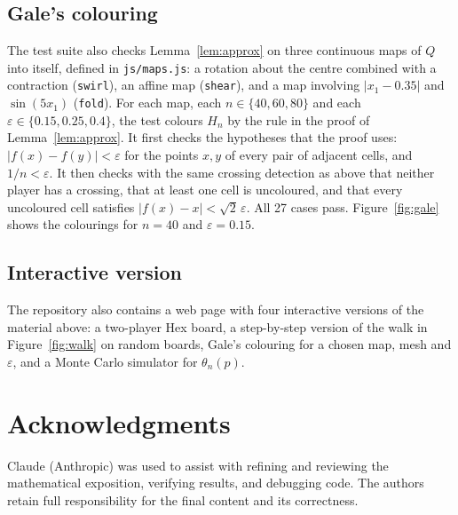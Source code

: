 \documentclass[11pt,a4paper]{amsart}
\theoremstyle{definition}
\theoremstyle{remark}
\newcommand{\Q}{Q}
\newcommand{\eps}{\varepsilon}
\begin{document}
\subsection{Gale's colouring}

The test suite also checks Lemma~\ref{lem:approx} on three continuous maps of $\Q$ into itself, defined in \texttt{js/maps.js}: a rotation about the centre combined with a contraction (\texttt{swirl}), an affine map (\texttt{shear}), and a map involving $|x_1 - 0.35|$ and $\sin(5x_1)$ (\texttt{fold}). For each map, each $n \in \{40, 60, 80\}$ and each $\eps \in \{0.15, 0.25, 0.4\}$, the test colours $H_n$ by the rule in the proof of Lemma~\ref{lem:approx}. It first checks the hypotheses that the proof uses: $|f(x) - f(y)| < \eps$ for the points $x, y$ of every pair of adjacent cells, and $1/n < \eps$. It then checks with the same crossing detection as above that neither player has a crossing, that at least one cell is uncoloured, and that every uncoloured cell satisfies $|f(x) - x| < \sqrt{2}\,\eps$. All 27 cases pass. Figure~\ref{fig:gale} shows the colourings for $n = 40$ and $\eps = 0.15$.


\subsection{Interactive version}

The repository also contains a web page with four interactive versions of the material above: a two-player Hex board, a step-by-step version of the walk in Figure~\ref{fig:walk} on random boards, Gale's colouring for a chosen map, mesh and $\eps$, and a Monte Carlo simulator for $\theta_n(p)$.

\section*{Acknowledgments}

Claude (Anthropic) was used to assist with refining and reviewing the mathematical exposition, verifying results, and debugging code. The authors retain full responsibility for the final content and its correctness.
\end{document}
